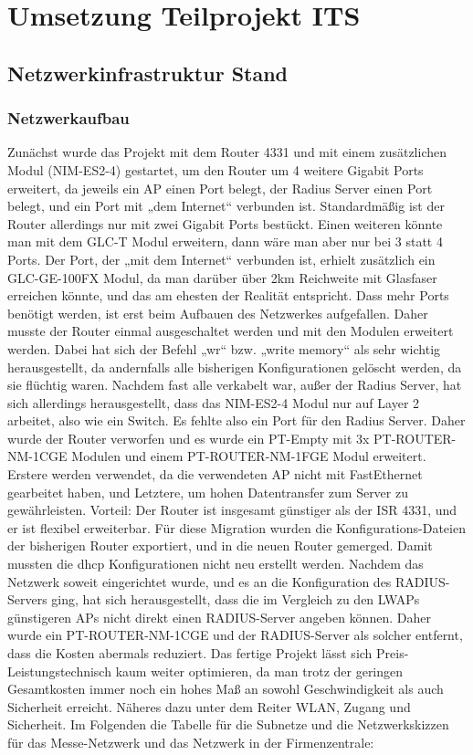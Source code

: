 \chapter{Umsetzung Teilprojekt ITS}
\section{Netzwerkinfrastruktur Stand}
\subsection{Netzwerkaufbau}
Zunächst wurde das Projekt mit dem Router 4331 und mit einem zusätzlichen Modul (NIM-ES2-4) gestartet, um den Router um 4 weitere Gigabit Ports erweitert, da jeweils ein AP einen Port belegt, der Radius Server einen Port belegt, und ein Port mit „dem Internet“ verbunden ist. Standardmäßig ist der Router allerdings nur mit zwei Gigabit Ports bestückt. Einen weiteren könnte man mit dem GLC-T Modul erweitern, dann wäre man aber nur bei 3 statt 4 Ports. Der Port, der „mit dem Internet“ verbunden ist, erhielt zusätzlich ein GLC-GE-100FX Modul, da man darüber über 2km Reichweite mit Glasfaser erreichen könnte, und das am ehesten der Realität entspricht. 
Dass mehr Ports benötigt werden, ist erst beim Aufbauen des Netzwerkes aufgefallen. Daher musste der Router einmal ausgeschaltet werden und mit den Modulen erweitert werden. Dabei hat sich der Befehl „wr“ bzw. „write memory“ als sehr wichtig herausgestellt, da andernfalls alle bisherigen Konfigurationen gelöscht werden, da sie flüchtig waren.
Nachdem fast alle verkabelt war, außer der Radius Server, hat sich allerdings herausgestellt, dass das NIM-ES2-4 Modul nur auf Layer 2 arbeitet, also wie ein Switch. Es fehlte also ein Port für den Radius Server. Daher wurde der Router verworfen und es wurde ein PT-Empty mit 3x PT-ROUTER-NM-1CGE Modulen und einem PT-ROUTER-NM-1FGE Modul erweitert. Erstere werden verwendet, da die verwendeten AP nicht mit FastEthernet gearbeitet haben, und Letztere, um hohen Datentransfer zum Server zu gewährleisten. Vorteil: Der Router ist insgesamt günstiger als der ISR 4331, und er ist flexibel erweiterbar. Für diese Migration wurden die Konfigurations-Dateien der bisherigen Router exportiert, und in die neuen Router gemerged. Damit mussten die dhcp Konfigurationen nicht neu erstellt werden.
Nachdem das Netzwerk soweit eingerichtet wurde, und es an die Konfiguration des RADIUS-Servers ging, hat sich herausgestellt, dass die im Vergleich zu den LWAPs günstigeren APs nicht direkt einen RADIUS-Server angeben können. Daher wurde ein PT-ROUTER-NM-1CGE und der RADIUS-Server als solcher entfernt, dass die Kosten abermals reduziert. Das fertige Projekt lässt sich Preis-Leistungstechnisch kaum weiter optimieren, da man trotz der geringen Gesamtkosten immer noch ein hohes Maß an sowohl Geschwindigkeit als auch Sicherheit erreicht. Näheres dazu unter dem Reiter WLAN, Zugang und Sicherheit. 
Im Folgenden die Tabelle für die Subnetze und die Netzwerkskizzen für das Messe-Netzwerk und das Netzwerk in der Firmenzentrale:

